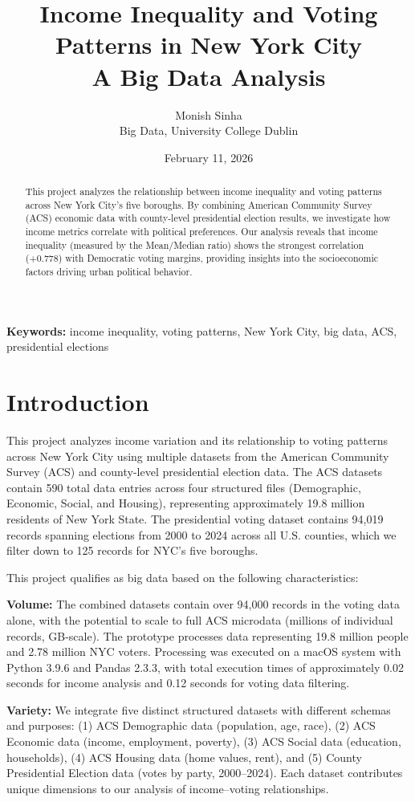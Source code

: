 \documentclass[11pt,a4paper]{article}
\title{\textbf{Income Inequality and Voting Patterns in New York City}\\[0.5em]\large A Big Data Analysis}
\author{Monish Sinha\\Big Data, University College Dublin}
\date{February 11, 2026}
\begin{document}
\maketitle

\begin{abstract}
This project analyzes the relationship between income inequality and voting patterns across New York City's five boroughs. By combining American Community Survey (ACS) economic data with county-level presidential election results, we investigate how income metrics correlate with political preferences. Our analysis reveals that income inequality (measured by the Mean/Median ratio) shows the strongest correlation (+0.778) with Democratic voting margins, providing insights into the socioeconomic factors driving urban political behavior.
\end{abstract}

\textbf{Keywords:} income inequality, voting patterns, New York City, big data, ACS, presidential elections

\section{Introduction}

This project analyzes income variation and its relationship to voting patterns across New York City using multiple datasets from the American Community Survey (ACS) and county-level presidential election data. The ACS datasets contain 590 total data entries across four structured files (Demographic, Economic, Social, and Housing), representing approximately 19.8 million residents of New York State. The presidential voting dataset contains 94,019 records spanning elections from 2000 to 2024 across all U.S. counties, which we filter down to 125 records for NYC's five boroughs.

This project qualifies as big data based on the following characteristics:

\textbf{Volume:} The combined datasets contain over 94,000 records in the voting data alone, with the potential to scale to full ACS microdata (millions of individual records, GB-scale). The prototype processes data representing 19.8 million people and 2.78 million NYC voters. Processing was executed on a macOS system with Python 3.9.6 and Pandas 2.3.3, with total execution times of approximately 0.02 seconds for income analysis and 0.12 seconds for voting data filtering.

\textbf{Variety:} We integrate five distinct structured datasets with different schemas and purposes: (1) ACS Demographic data (population, age, race), (2) ACS Economic data (income, employment, poverty), (3) ACS Social data (education, households), (4) ACS Housing data (home values, rent), and (5) County Presidential Election data (votes by party, 2000--2024). Each dataset contributes unique dimensions to our analysis of income--voting relationships.
\end{document}
